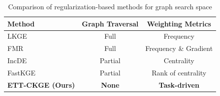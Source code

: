 \begin{table}[h]
\centering
\caption{Comparison of regularization-based methods for graph search space}
\label{tab:comparison}
\begin{tabular}{lcc}
\toprule
Method & Graph Traversal & Weighting Metrics \\ 
\midrule
LKGE  & Full  & Frequency  \\
FMR   & Full  & Frequency \& Gradient \\
IncDE & Partial  & Centrality    \\
FastKGE  & Partial  & Rank of centrality \\
\textbf{ETT-CKGE (Ours)} & \textbf{None}  & \textbf{Task-driven} \\ 
\bottomrule
\end{tabular}
\end{table}
